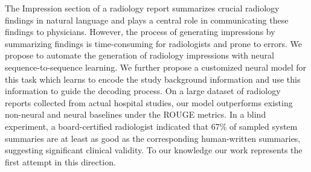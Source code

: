 The Impression section of a radiology report summarizes crucial radiology findings in natural language and plays a central role in communicating these findings to physicians. However, the process of generating impressions by summarizing findings is time-consuming for radiologists and prone to errors. We propose to automate the generation of radiology impressions with neural sequence-to-sequence learning. We further propose a customized neural model for this task which learns to encode the study background information and use this information to guide the decoding process. On a large dataset of radiology reports collected from actual hospital studies, our model outperforms existing non-neural and neural baselines under the ROUGE metrics. In a blind experiment, a board-certified radiologist indicated that 67\% of sampled system summaries are at least as good as the corresponding human-written summaries, suggesting significant clinical validity. To our knowledge our work represents the first attempt in this direction.
